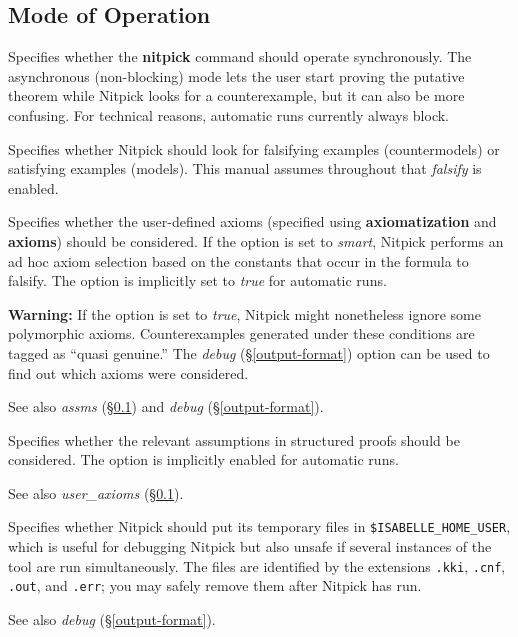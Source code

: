 \documentclass[a4paper,12pt]{article}
\begin{document}
\subsection{Mode of Operation}
\label{mode-of-operation}

\begin{enum}
Specifies whether the \textbf{nitpick} command should operate synchronously.
The asynchronous (non-blocking) mode lets the user start proving the putative
theorem while Nitpick looks for a counterexample, but it can also be more
confusing. For technical reasons, automatic runs currently always block.

Specifies whether Nitpick should look for falsifying examples (countermodels) or
satisfying examples (models). This manual assumes throughout that
\textit{falsify} is enabled.

Specifies whether the user-defined axioms (specified using 
\textbf{axiomatization} and \textbf{axioms}) should be considered. If the option
is set to \textit{smart}, Nitpick performs an ad hoc axiom selection based on
the constants that occur in the formula to falsify. The option is implicitly set
to \textit{true} for automatic runs.

\textbf{Warning:} If the option is set to \textit{true}, Nitpick might
nonetheless ignore some polymorphic axioms. Counterexamples generated under
these conditions are tagged as ``quasi genuine.'' The \textit{debug}
(\S\ref{output-format}) option can be used to find out which axioms were
considered.

\nopagebreak
{\small See also \textit{assms} (\S\ref{mode-of-operation}) and \textit{debug}
(\S\ref{output-format}).}

Specifies whether the relevant assumptions in structured proofs should be
considered. The option is implicitly enabled for automatic runs.

\nopagebreak
{\small See also \textit{user\_axioms} (\S\ref{mode-of-operation}).}

Specifies whether Nitpick should put its temporary files in
\texttt{\$ISABELLE\_\allowbreak HOME\_\allowbreak USER}, which is useful for
debugging Nitpick but also unsafe if several instances of the tool are run
simultaneously. The files are identified by the extensions
\texttt{.kki}, \texttt{.cnf}, \texttt{.out}, and
\texttt{.err}; you may safely remove them after Nitpick has run.

\nopagebreak
{\small See also \textit{debug} (\S\ref{output-format}).}
\end{enum}
\end{document}
